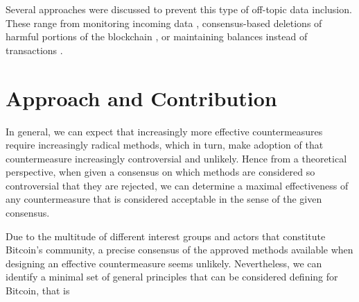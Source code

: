 \documentclass[a4paper,11pt,titlepage]{scrbook}
\begin{document}
Several approaches were discussed to prevent this type of off-topic data inclusion.
These range from monitoring incoming data \cite[Sec.~IV.A]{matzutt_thwarting_2018}, consensus-based deletions of harmful portions of the blockchain \cites{ateniese_redactable_2017}{puddu_chain:_2017}, 
or maintaining balances instead of transactions \cite{bruce_miniblockchain_2017}.





\section{Approach and Contribution}

In general, we can expect that increasingly more effective countermeasures require increasingly radical methods, which in turn, make adoption of that countermeasure increasingly controversial and unlikely.
Hence from a theoretical perspective, when given a consensus on which methods are considered so controversial that they are rejected, we can determine a maximal effectiveness of any countermeasure that is considered acceptable in the sense of the given consensus.

Due to the multitude of different interest groups and actors that constitute Bitcoin's community, a precise consensus of the approved methods available when designing an effective countermeasure seems unlikely.
Nevertheless, we can identify a minimal set of general principles that can be considered defining for Bitcoin,
that is 
\end{document}
